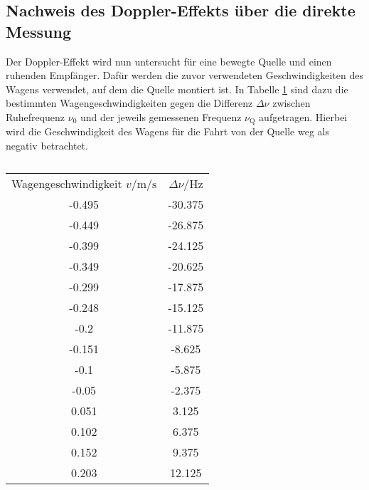\subsection{Nachweis des Doppler-Effekts über die direkte Messung}
Der Doppler-Effekt wird nun untersucht für eine bewegte Quelle und einen ruhenden Empfänger.
Dafür werden die zuvor verwendeten Geschwindigkeiten des Wagens verwendet, auf dem die Quelle montiert ist.
In Tabelle \ref{tab:direkt} sind dazu die bestimmten Wagengeschwindigkeiten gegen die Differenz $\Delta \nu$ zwischen Ruhefrequenz $\nu_\mathrm{0}$ und der jeweils gemessenen Frequenz $\nu_{\mathrm{Q}}$ aufgetragen.
Hierbei wird die Geschwindigkeit des Wagens für die Fahrt von der Quelle weg als negativ betrachtet.
\begin{table}
	\centering
	\caption{}
	\label{tab:direkt}
	\begin{tabular}{cc}
		Wagengeschwindigkeit $v$/$\si{\meter\per\second}$ & $\Delta \nu$/$\si{\Hz}$ \\
		-0.495                                            & -30.375                 \\
		-0.449                                            & -26.875                 \\
		-0.399                                            & -24.125                 \\
		-0.349                                            & -20.625                 \\
		-0.299                                            & -17.875                 \\
		-0.248                                            & -15.125                 \\
		-0.2                                              & -11.875                 \\
		-0.151                                            & -8.625                  \\
		-0.1                                              & -5.875                  \\
		-0.05                                             & -2.375                  \\
		0.051                                             & 3.125                   \\
		0.102                                             & 6.375                   \\
		0.152                                             & 9.375                   \\
		0.203                                             & 12.125                  \\

\end{tabular}
\end{table}
